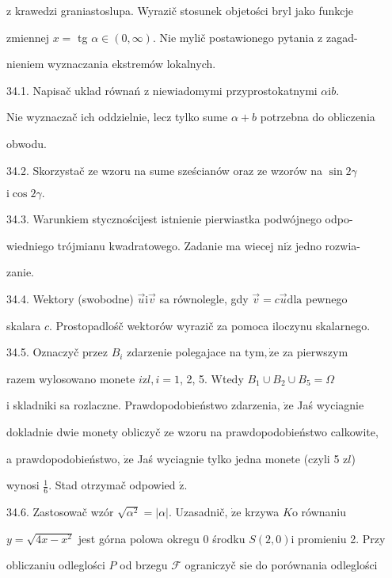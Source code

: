 \documentclass[a4paper,12pt]{article}
\begin{document}
$\mathrm{z}$ krawedzi graniastoslupa. Wyrazič stosunek objetości bryl jako funkcje

zmiennej $x =$ tg $\alpha \in (0,\infty)$. Nie mylič postawionego pytania $\mathrm{z}$ zagad-

nieniem wyznaczania ekstremów lokalnych.

34.1. Napisač uklad równań $\mathrm{z}$ niewiadomymi przyprostokatnymi $\alpha \mathrm{i}b.$

Nie wyznaczač ich oddzielnie, lecz tylko sume $\alpha+b$ potrzebna do obliczenia

obwodu.

34.2. Skorzystač ze wzoru na sume sześcianów oraz ze wzorów na $\sin 2\gamma$

$\mathrm{i}\cos 2\gamma.$

34.3. Warunkiem stycznościjest istnienie pierwiastka podwójnego odpo-

wiedniego trójmianu kwadratowego. Zadanie ma wiecej $\mathrm{n}\mathrm{i}\dot{\mathrm{z}}$ jedno rozwia-

zanie.

34.4. Wektory (swobodne) $\vec{u}\mathrm{i}\vec{v}$ sa równolegle, gdy $\vec{v}=c\vec{u}\mathrm{d}\mathrm{l}\mathrm{a}$ pewnego

skalara $c$. Prostopadlośč wektorów wyrazič za pomoca iloczynu skalarnego.

34.5. Oznaczyč przez $B_{i}$ zdarzenie polegajace na $\mathrm{t}\mathrm{y}\mathrm{m}, \dot{\mathrm{z}}\mathrm{e}$ za pierwszym

razem wylosowano monete $i \mathrm{z}l, i = 1$, 2, 5. Wtedy $B_{1}\cup B_{2}\cup B_{5} = \Omega$

$\mathrm{i}$ skladniki sa rozlaczne. Prawdopodobieństwo zdarzenia, $\dot{\mathrm{z}}\mathrm{e}$ Jaś wyciagnie

dokladnie dwie monety obliczyč ze wzoru na prawdopodobieństwo calkowite,

a prawdopodobieństwo, $\dot{\mathrm{z}}\mathrm{e}$ Jaś wyciagnie tylko jedna monete (czyli 5 $\mathrm{z}l$)

wynosi $\displaystyle \frac{1}{6}$. Stad otrzymač odpowied $\acute{\mathrm{z}}.$

34.6. Zastosowač wzór $\sqrt{\alpha^{2}}=|\alpha|$. Uzasadnič, $\dot{\mathrm{z}}\mathrm{e}$ krzywa $K\mathrm{o}$ równaniu

$y=\sqrt{4x-x^{2}}$ jest górna polowa okregu $0$ środku $S(2,0)\mathrm{i}$ promieniu 2. Przy

obliczaniu odleglości $P$ od brzegu $\mathcal{F}$ ograniczyč $\mathrm{s}\mathrm{i}\mathrm{e}$ do porównania odleglości
\end{document}

